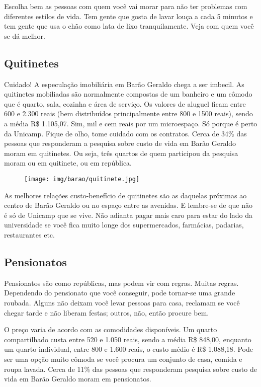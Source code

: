 Escolha bem as pessoas com quem você vai morar para não ter problemas com
diferentes estilos de vida. Tem gente que gosta de lavar louça a cada 5 minutos
e tem gente que usa o chão como lata de lixo tranquilamente. Veja com quem você
se dá melhor.

\subsection{Quitinetes}

Cuidado! A especulação imobiliária em Barão Geraldo chega a ser imbecil. As
quitinetes mobiliadas são normalmente compostas de um banheiro e um cômodo que
é quarto, sala, cozinha e área de serviço. Os valores de aluguel ficam entre
600 e 2.300 reais (bem distribuídos principalmente entre 800 e 1500 reais),
sendo a média R\$ 1.105,07. Sim, mil e cem reais por um microespaço. Só porque
é perto da Unicamp. Fique de olho, tome cuidado com os contratos. Cerca de 34\%
das pessoas que responderam a pesquisa sobre custo de vida em Barão Geraldo
moram em quitinetes. Ou seja, três quartos de quem participou da pesquisa moram
ou em quitinete, ou em república.

\begin{figure}[h!]
    \centering
    \texttt{[image: img/barao/quitinete.jpg]}
\end{figure}

As melhores relações custo-benefício de quitinetes são as daquelas próximas ao
centro de Barão Geraldo ou no espaço entre as avenidas. E lembre-se de que não
é só de Unicamp que se vive. Não adianta pagar mais caro para estar do lado da
universidade se você fica muito longe dos supermercados, farmácias, padarias,
restaurantes etc.

\subsection{Pensionatos}

Pensionatos são como repúblicas, mas podem vir com regras. Muitas regras.
Dependendo do pensionato que você conseguir, pode tornar-se uma grande roubada.
Alguns não deixam você levar pessoas para casa, reclamam se você chegar tarde e
não liberam festas; outros, não, então procure bem.

O preço varia de acordo com as comodidades disponíveis. Um quarto compartilhado
custa entre 520 e 1.050 reais, sendo a média R\$ 848,00, enquanto um quarto
individual, entre 800 e 1.600 reais, o custo médio é R\$ 1.088,18. Pode ser uma
opção muito cômoda se você procura um conjunto de casa, comida e roupa lavada.
Cerca de 11\% das pessoas que responderam pesquisa sobre custo de vida em Barão
Geraldo moram em pensionatos.

